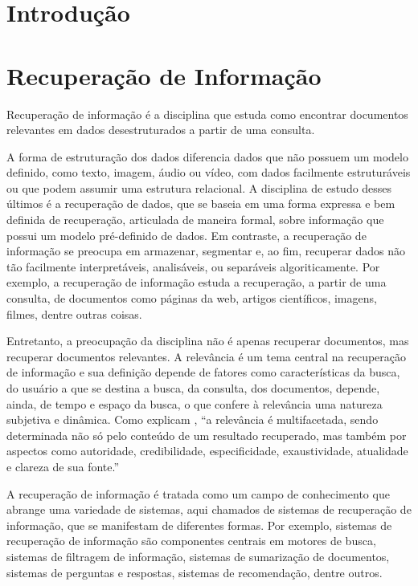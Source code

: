\documentclass[
	12pt,				%
	openright,			%
	oneside,			%
	a4paper,			%
	english,			%
	french,				%
	spanish,			%
	brazil				%
	]{abntex2}
\begin{document}
\textual

\chapter*[Introdução]{Introdução}
\label{chap:intro}

\chapter{Recuperação de Informação}\label{ch:recuperacao-de-informacao}

Recuperação de informação é a disciplina que estuda como encontrar documentos relevantes em dados desestruturados a
partir de uma consulta.

A forma de estruturação dos dados diferencia dados que não possuem um modelo definido, como texto, imagem,
áudio ou vídeo, com dados facilmente estruturáveis ou que podem assumir uma estrutura relacional.
A disciplina de estudo desses últimos é a recuperação de dados, que se baseia em uma forma expressa e bem
definida de recuperação, articulada de maneira formal, sobre informação que possui um modelo pré-definido de dados.
Em contraste, a recuperação de informação se preocupa em armazenar, segmentar e, ao fim, recuperar dados não tão
facilmente interpretáveis, analisáveis, ou separáveis algoriticamente.
Por exemplo, a recuperação de informação estuda a recuperação, a partir de uma consulta, de
documentos como páginas da web, artigos científicos, imagens, filmes, dentre outras coisas.

Entretanto, a preocupação da disciplina não é apenas recuperar documentos, mas recuperar documentos relevantes.
A relevância é um tema central na recuperação de informação e sua definição depende de fatores como
características da busca, do usuário a que se destina a busca, da consulta, dos documentos, depende, ainda, de
tempo e espaço da busca, o que confere à relevância uma natureza subjetiva e dinâmica.
Como explicam , ``a relevância é multifacetada, sendo determinada não só pelo conteúdo de um
resultado recuperado, mas também por aspectos como autoridade, credibilidade, especificidade, exaustividade,
atualidade e clareza de sua fonte.''

A recuperação de informação é tratada como um campo de conhecimento que abrange uma variedade de
sistemas, aqui chamados de sistemas de recuperação de informação, que se manifestam de diferentes formas.
Por exemplo, sistemas de recuperação de informação são componentes centrais em motores de busca,
sistemas de filtragem de informação, sistemas de sumarização de documentos, sistemas de perguntas e respostas,
sistemas de recomendação, dentre outros. \cite{Ceri2013}
\end{document}
